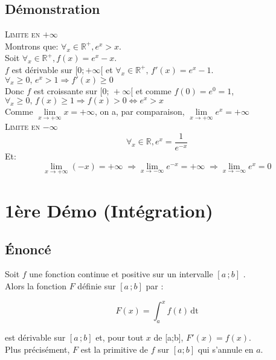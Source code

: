 \documentclass[12px]{article}
\newcommand\I{$[a\,;b]$ }
\begin{document}
	\subsection{Démonstration}
	\textsc{Limite en $+\infty$}\\
	Montrons que: $\forall_x\in\mathbb{R}^+, e^x >x$.\\
	Soit $\forall_x\in\mathbb{R}^+, f(x)=e^x -x$.\\
	$f$ est dérivable sur $[0; +\infty[$ et $\forall_x\in\mathbb{R}^+, \,f'(x)=e^x -1$.\\
	$\forall_x\geq 0, \,e^x >1 \Rightarrow f'(x)\geq 0$\\
	Donc $f$ est croissante sur $[0;\, +\infty[$ et comme $f(0)= e^0= 1$,\\
	$\forall_x\geq 0, \,f(x)\geq 1\Rightarrow f(x)>0 \Leftrightarrow e^x > x$\\
	Comme $\lim\limits_{x \rightarrow +\infty}x=+\infty$, on a, par comparaison, $\lim\limits_{x\rightarrow +\infty}e^x=+\infty$\\
	\textsc{Limite en $-\infty$}
	\begin{displaymath}
		\forall_x\in\mathbb{R}, e^x = \frac{1}{e^{-x}}
	\end{displaymath}
	Et:\\
	\begin{displaymath}
		\lim\limits_{x\rightarrow +\infty}(-x)=+\infty \;\Rightarrow \lim\limits_{x\rightarrow -\infty}e^{-x}=+\infty \;\Rightarrow \lim\limits_{x\rightarrow -\infty}e^x=0
	\end{displaymath}
	
	\section{1ère Démo (Intégration)}
	
	\subsection{\'Enoncé}
	Soit $f$ une fonction continue et positive sur un intervalle \I.\\
	Alors la fonction $F$ définie sur \I par :
	\begin{center}
		\begin{displaymath}
			F(x) = \int_{a}^{x}f(t)\,\mathrm{dt}
		\end{displaymath}
	\end{center}
	est dérivable sur \I et, pour tout $x$ de [a;b], $F'(x)=f(x)$.\\
	Plus précisément, $F$ est la primitive de $f$ sur $[a;b]$ qui s'annule en $a$.
	
\end{document}

